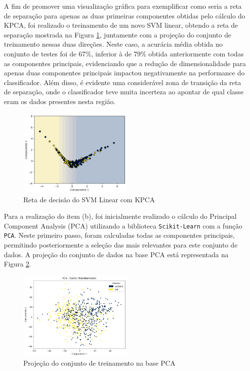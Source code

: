 \documentclass[]{abntex2}
\begin{document}
A fim de promover uma visualização gráfica para exemplificar como seria a reta de separação para apenas as duas primeiras componentes obtidas pelo cálculo do KPCA, foi realizado o treinamento de um novo SVM linear, obtendo a reta de separação mostrada na Figura \ref{fig:kpca_reta}, juntamente com a projeção do conjunto de treinamento nessas duas direções. Neste caso, a acurácia média obtida no conjunto de testes foi de 67\%, inferior à de 79\% obtida anteriormente com todas as componentes principais, evidenciando que a redução de dimensionalidade para apenas duas componentes principais impactou negativamente na performance do classificador. Além disso, é evidente uma considerável zona de transição da reta de separação, onde o classificador teve muita incerteza ao apontar de qual classe eram os dados presentes nesta região.

\begin{figure}[H]
    \centering 
    \includegraphics[width=0.5\textwidth]{imgs/ex1/kpca_reta.png}
    \caption{Reta de decisão do SVM Linear com KPCA}
    \label{fig:kpca_reta} %
\end{figure}

\newpage

Para a realização do item (b), foi inicialmente realizado o cálculo do Principal Component Analysis (PCA) utilizando a biblioteca \texttt{Scikit-Learn} com a função \texttt{PCA}. Neste primeiro passo, foram calculadas todas as componentes principais, permitindo posteriormente a seleção das mais relevantes para este conjunto de dados. A projeção do conjunto de dados na base PCA está representada na Figura \ref{fig:PCA}.

\begin{figure}[H]
    \centering 
    \includegraphics[width=0.5\textwidth]{imgs/ex1/PCA.png}
    \caption{Projeção do conjunto de treinamento na base PCA}
    \label{fig:PCA} %
\end{figure}
\end{document}
